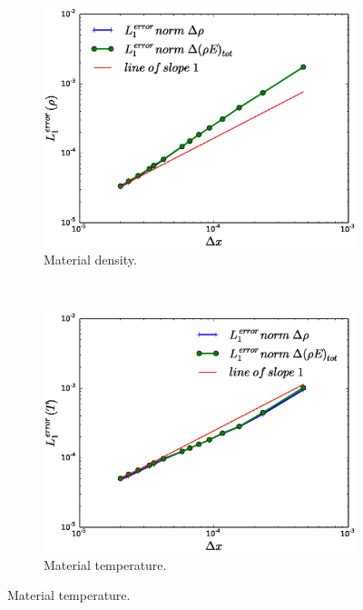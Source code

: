 \documentclass[times,doublespace]{fldauth}%
\begin{document}
\begin{figure}[ht]
    \begin{subfigure}{0.5\textwidth}
    \centering
    \includegraphics[width=\linewidth]{figures/cst-xs/mach-3/mass-energy-diff-scd-method-density-convergence.eps}
    \caption{Material density.}\label{fig:mach-3-cst-xs-density-conv}
    \end{subfigure}
    ~
    \begin{subfigure}{0.5\textwidth}
    \centering
    \includegraphics[width=\linewidth]{figures/cst-xs/mach-3/mass-energy-diff-scd-method-mat-temp-convergence.eps}
    \caption{Material temperature.}\label{fig:mach-3-cst-xs-temp-conv}
    \end{subfigure}
    

\end{figure}
\end{document}

